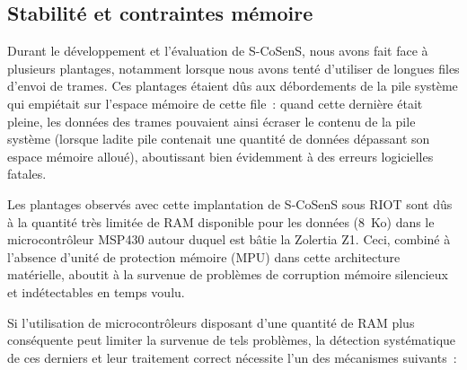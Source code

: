 \subsection{Stabilité et contraintes mémoire}
\label{SubsecStabl}

Durant le développement et l'évaluation de S-CoSenS, nous avons
fait face à plusieurs plantages, notamment lorsque nous avons tenté
d'utiliser de longues files d'envoi de trames. Ces plantages étaient
dûs aux débordements de la pile système qui empiétait sur l'espace mémoire
de cette file~: quand cette dernière était pleine, les données des trames
pouvaient ainsi écraser le contenu de la pile système (lorsque ladite pile
contenait une quantité de données dépassant son espace mémoire alloué),
aboutissant bien évidemment à des erreurs logicielles fatales.

Les plantages observés avec cette implantation de S-CoSenS sous RIOT sont
dûs à la quantité très limitée de RAM disponible pour les données (8~Ko)
dans le microcontrôleur MSP430 autour duquel est bâtie la 
Zolertia Z1. Ceci, combiné à l'absence d'unité de protection mémoire
(MPU) dans cette architecture matérielle, aboutit à la survenue de
problèmes de corruption mémoire silencieux et indétectables en temps
voulu.

Si l'utilisation de microcontrôleurs disposant d'une quantité de RAM plus
conséquente peut limiter la survenue de tels problèmes, la détection
systématique de ces derniers et leur traitement correct nécessite
l'un des mécanismes suivants~:

